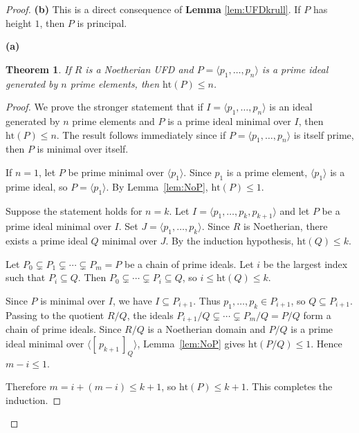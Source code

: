 \documentclass[addpoints,10pt]{exam}
\theoremstyle{plain}
\newcommand{\theoremname}{Theorem}
\newtheorem{thm}{\protect\theoremname}
\theoremstyle{definition}
\theoremstyle{plain}
\theoremstyle{plain}
\theoremstyle{definition}
\newcommand{\class}[2][]{\ensuremath{\left[\,#2\,\right]_{#1}}}
\begin{document}
\begin{proof}\textbf{(b)} This is a direct consequence of \textbf{Lemma }\ref{lem:UFDkrull}. If $P$ has height $1$, then $P$ is principal.

\textbf{(a)} \begin{thm}
If $R$ is a Noetherian UFD and $P=\langle p_{1},\hdots,p_{n}\rangle$ is a prime ideal generated by $n$ prime elements, then $\mathrm{ht}(P)\leq n$.
\end{thm}

\begin{proof}
We prove the stronger statement that if $I=\langle p_{1},\hdots,p_{n}\rangle$ is an ideal generated by $n$ prime elements and $P$ is a prime ideal minimal over $I$, then $\mathrm{ht}(P)\leq n$. The result follows immediately since if $P=\langle p_{1},\hdots,p_{n}\rangle$ is itself prime, then $P$ is minimal over itself.

If $n=1$, let $P$ be prime minimal over $\langle p_{1}\rangle$. Since $p_{1}$ is a prime element, $\langle p_{1}\rangle$ is a prime ideal, so $P=\langle p_{1}\rangle$. By Lemma~\ref{lem:NoP}, $\mathrm{ht}(P)\leq 1$.

Suppose the statement holds for $n=k$. Let $I=\langle p_{1},\hdots,p_{k},p_{k+1}\rangle$ and let $P$ be a prime ideal minimal over $I$. Set $J=\langle p_{1},\hdots,p_{k}\rangle$. Since $R$ is Noetherian, there exists a prime ideal $Q$ minimal over $J$. By the induction hypothesis, $\mathrm{ht}(Q)\leq k$.

Let $P_{0}\subsetneq P_{1}\subsetneq\cdots\subsetneq P_{m}=P$ be a chain of prime ideals. Let $i$ be the largest index such that $P_{i}\subseteq Q$. Then $P_{0}\subsetneq\cdots\subsetneq P_{i}\subseteq Q$, so $i\leq\mathrm{ht}(Q)\leq k$.

Since $P$ is minimal over $I$, we have $I\subseteq P_{i+1}$. Thus $p_{1},\hdots,p_{k}\in P_{i+1}$, so $Q\subseteq P_{i+1}$. Passing to the quotient $R/Q$, the ideals $P_{i+1}/Q\subsetneq\cdots\subsetneq P_{m}/Q=P/Q$ form a chain of prime ideals. Since $R/Q$ is a Noetherian domain and $P/Q$ is a prime ideal minimal over $\langle\class[Q]{p_{k+1}}\rangle$, Lemma~\ref{lem:NoP} gives $\mathrm{ht}(P/Q)\leq 1$. Hence $m-i\leq 1$.

Therefore $m=i+(m-i)\leq k+1$, so $\mathrm{ht}(P)\leq k+1$. This completes the induction.
\end{proof}

\end{proof}
\end{document}

